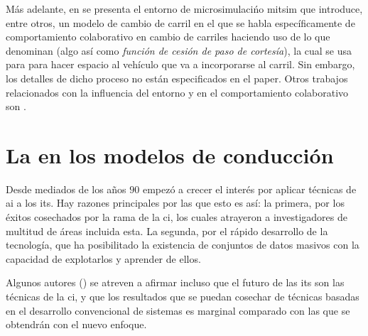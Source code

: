 Más adelante, en \cite{Yang1996} se presenta el entorno de microsimulacińo \gls{mitsim} que introduce, entre otros, un modelo de cambio de carril en el que se habla específicamente de comportamiento colaborativo en cambio de carriles haciendo uso de lo que denominan \textit{} (algo así como \textit{función de cesión de paso de cortesía}), la cual se usa para para hacer espacio al vehículo que va a incorporarse al carril. Sin embargo, los detalles de dicho proceso no están especificados en el paper. Otros trabajos relacionados con la influencia del entorno y en el comportamiento colaborativo son \cite{Ahmed1999, Hidas2002}.

\section{La  en los modelos de conducción}

Desde mediados de los años $90$ empezó a crecer el interés por aplicar técnicas de \gls{ai} a los \gls{its}. Hay razones principales por las que esto es así: la primera, por los éxitos cosechados por la rama de la \gls{ci}, los cuales atrayeron a investigadores de multitud de áreas incluida esta. La segunda, por el rápido desarrollo de la tecnología, que ha posibilitado la existencia de conjuntos de datos masivos con la capacidad de explotarlos y aprender de ellos.

Algunos autores (\cite{Zhang2011}) se atreven a afirmar incluso que el futuro de las \gls{its} son las técnicas de la \gls{ci}, y que los resultados que se puedan cosechar de técnicas basadas en el desarrollo convencional de sistemas es marginal comparado con las que se obtendrán con el nuevo enfoque.

